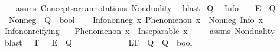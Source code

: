 \begin{isabellebody}
%
\isadelimproof
\ \ %
\endisadelimproof
%
\isatagproof
{}\isamarkupfalse%
\ assms\ Concepts{\isacharunderscore}{\kern0pt}are{\isacharunderscore}{\kern0pt}annotations\ Nonduality\ \isamarkupfalse%
\ blast%
\endisatagproof
{\isafoldproof}%
%
\isadelimproof
%
\endisadelimproof
%
\isadelimdocument
%
\endisadelimdocument
%
\isatagdocument
%
\isamarkuptrue%
%
\endisatagdocument
{\isafolddocument}%
%
\isadelimdocument
%
\endisadelimdocument
{}\isamarkupfalse%
\ Q%
\isadelimdocument
%
\endisadelimdocument
%
\isatagdocument
%
\isamarkuptrue%
%
\endisatagdocument
{\isafolddocument}%
%
\isadelimdocument
%
\endisadelimdocument
{}\isamarkupfalse%
\isanewline
\ \ Info\ \ \ {\isacharcolon}{\kern0pt}{\isacharcolon}{\kern0pt}\ {\isachardoublequoteopen}E\ {\isasymRightarrow}\ Q{\isachardoublequoteclose}\isanewline
\ \ Nonneg\ {\isacharcolon}{\kern0pt}{\isacharcolon}{\kern0pt}\ {\isachardoublequoteopen}Q\ {\isasymRightarrow}\ bool{\isachardoublequoteclose}\isanewline
\isanewline
{}\isamarkupfalse%
\ \isanewline
\ \ Info{\isacharunderscore}{\kern0pt}nonneg{\isacharcolon}{\kern0pt}\ {\isachardoublequoteopen}{\isasymforall}x{\isachardot}{\kern0pt}\ Phenomenon\ x\ {\isasymlongrightarrow}\ Nonneg\ {\isacharparenleft}{\kern0pt}Info\ x{\isacharparenright}{\kern0pt}{\isachardoublequoteclose}\isanewline
\isanewline
{}\isamarkupfalse%
\ Info{\isacharunderscore}{\kern0pt}nonreifying{\isacharcolon}{\kern0pt}\isanewline
\ \ \ {\isachardoublequoteopen}Phenomenon\ x{\isachardoublequoteclose}\ \ {\isachardoublequoteopen}Inseparable\ x\ {\isasymOmega}{\isachardoublequoteclose}\isanewline
%
\isadelimproof
\ \ %
\endisadelimproof
%
\isatagproof
{}\isamarkupfalse%
\ assms\ Nonduality\ \isamarkupfalse%
\ blast%
\endisatagproof
{\isafoldproof}%
%
\isadelimproof
%
\endisadelimproof
%
\isadelimdocument
%
\endisadelimdocument
%
\isatagdocument
%
\isamarkuptrue%
%
\endisatagdocument
{\isafolddocument}%
%
\isadelimdocument
%
\endisadelimdocument
{}\isamarkupfalse%
\isanewline
\ \ T\ \ {\isacharcolon}{\kern0pt}{\isacharcolon}{\kern0pt}\ {\isachardoublequoteopen}E\ {\isasymRightarrow}\ Q{\isachardoublequoteclose}\ \ \ \ \ \ \ \ \ \ \ \isanewline
\ \ LT\ {\isacharcolon}{\kern0pt}{\isacharcolon}{\kern0pt}\ {\isachardoublequoteopen}Q\ {\isasymRightarrow}\ Q\ {\isasymRightarrow}\ bool{\isachardoublequoteclose}\ \ \ \isanewline

\end{isabellebody}
